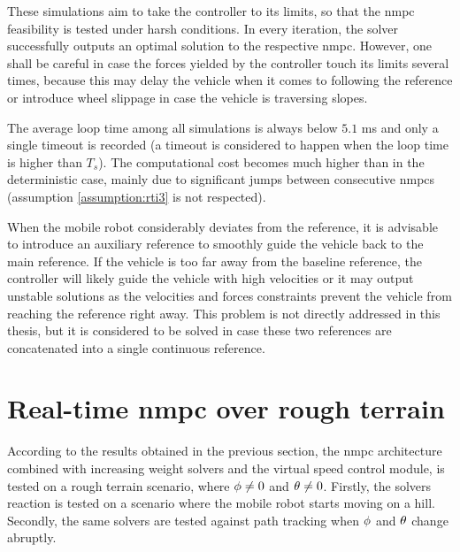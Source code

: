 These simulations aim to take the controller to its limits, so that the \acrshort{nmpc} feasibility is tested under harsh conditions. In every iteration, the solver successfully outputs an optimal solution to the respective \acrshort{nmpc}. However, one shall be careful in case the forces yielded by the controller touch its limits several times, because this may delay the vehicle when it comes to following the reference or introduce wheel slippage in case the vehicle is traversing slopes.

The average loop time among all simulations is always below $5.1$ ms and only a single timeout is recorded (a timeout is considered to happen when the loop time is higher than $T_s$). The computational cost becomes much higher than in the deterministic case, mainly due to significant jumps between consecutive \acrshort{nmpc}s (assumption \ref{assumption:rti3} is not respected).

\begin{remark}
When the mobile robot considerably deviates from the reference, it is advisable to introduce an auxiliary reference to smoothly guide the vehicle back to the main reference. If the vehicle is too far away from the baseline reference, the controller will likely guide the vehicle with high velocities or it may output unstable solutions as the velocities and forces constraints prevent the vehicle from reaching the reference right away. This problem is not directly addressed in this thesis, but it is considered to be solved in case these two references are concatenated into a single continuous reference.
\end{remark}

\section{Real-time \acrshort{nmpc} over rough terrain}
\label{section:realtimeonestageocproughterrain}

According to the results obtained in the previous section, the \acrshort{nmpc} architecture combined with increasing weight solvers and the virtual speed control module, is tested on a rough terrain scenario, where $\phi \neq 0$ and $\theta \neq 0$. Firstly, the solvers reaction is tested on a scenario where the mobile robot starts moving on a hill. Secondly, the same solvers are tested against path tracking when $\phi$ and $\theta$ change abruptly.

